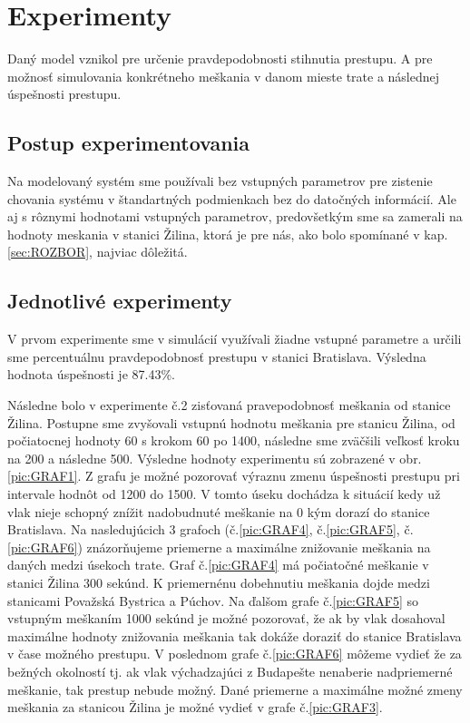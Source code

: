 \documentclass[11pt,a4paper]{article}
\begin{document}
\section{Experimenty}
\label{sec:EXPERIMENTY}

Daný model vznikol pre určenie pravdepodobnosti stihnutia prestupu.
A pre možnosť simulovania konkrétneho meškania v danom mieste trate a následnej úspešnosti prestupu.

\subsection{Postup experimentovania}
\label{sec:POSTUPEXP}

Na modelovaný systém sme používali bez vstupných parametrov pre zistenie chovania systému v štandartných podmienkach bez do datočných informácií.
Ale aj s rôznymi hodnotami vstupných parametrov, predovšetkým sme sa zamerali na hodnoty meskania v stanici Žilina, ktorá je pre nás, ako bolo spomínané v kap.\ref{sec:ROZBOR}, najviac dôležitá.

\subsection{Jednotlivé experimenty}
\label{sec:JEDNEXP}

V prvom experimente sme v simulácií využívali žiadne vstupné parametre a určili sme percentuálnu pravdepodobnosť prestupu v stanici Bratislava.
Výsledna hodnota úspešnosti je 87.43\%.

Následne bolo v experimente č.2 zisťovaná pravepodobnosť meškania od stanice Žilina.
Postupne sme zvyšovali vstupnú hodnotu meškania pre stanicu Žilina, od počiatocnej hodnoty 60 s krokom 60 po 1400, následne sme zväčšili veľkosť kroku na 200 a následne 500.
Výsledne hodnoty experimentu sú zobrazené v obr. \ref{pic:GRAF1}.
Z grafu je možné pozorovať výraznu zmenu úspešnosti prestupu pri intervale hodnôt od 1200 do 1500.
V tomto úseku dochádza k situácií kedy už vlak nieje schopný znížit nadobudnuté meškanie na 0 kým dorazí do stanice Bratislava.
Na nasledujúcich 3 grafoch (č.\ref{pic:GRAF4}, č.\ref{pic:GRAF5}, č.\ref{pic:GRAF6}) znázorňujeme priemerne a maximálne znižovanie meškania na daných medzi úsekoch trate.
Graf č.\ref{pic:GRAF4} má počiatočné meškanie v stanici Žilina 300 sekúnd.
K priemernénu dobehnutiu meškania dojde medzi stanicami Považská Bystrica a Púchov.
Na ďalšom grafe č.\ref{pic:GRAF5} so vstupným meškaním 1000 sekúnd je možné pozorovať, že ak by vlak dosahoval maximálne hodnoty znižovania meškania tak dokáže doraziť do stanice Bratislava v čase možného prestupu.
V poslednom grafe č.\ref{pic:GRAF6} môžeme vydieť že za bežných okolností tj. ak vlak výchadzajúci z Budapešte nenaberie nadpriemerné meškanie, tak prestup nebude možný.
Dané priemerne a maximálne možné zmeny meškania za stanicou Žilina je možné vydieť v grafe č.\ref{pic:GRAF3}.
\end{document}

